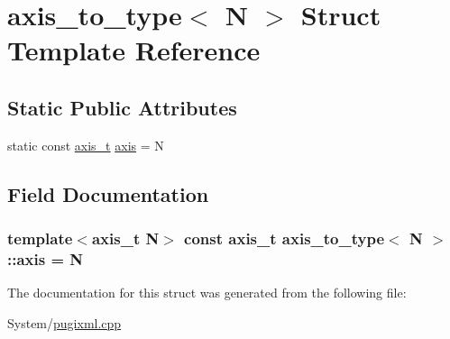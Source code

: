 \hypertarget{structaxis__to__type}{\section{axis\-\_\-to\-\_\-type$<$ N $>$ Struct Template Reference}
\label{structaxis__to__type}
}
\subsection*{Static Public Attributes}
\begin{DoxyCompactItemize}
\item 
static const \hyperlink{pugixml_8cpp_ae7747145441b0591a5c04f20f6f9189a}{axis\-\_\-t} \hyperlink{structaxis__to__type_ac9d75681918ad98c980db0f49b570b50}{axis} = N
\end{DoxyCompactItemize}


\subsection{Field Documentation}
\hypertarget{structaxis__to__type_ac9d75681918ad98c980db0f49b570b50}{
\subsubsection[{axis}]{\setlength{\rightskip}{0pt plus 5cm}template$<$axis\-\_\-t N$>$ const {\bf axis\-\_\-t} {\bf axis\-\_\-to\-\_\-type}$<$ N $>$\-::axis = N\hspace{0.3cm}{\ttfamily [static]}}}\label{structaxis__to__type_ac9d75681918ad98c980db0f49b570b50}


The documentation for this struct was generated from the following file\-:\begin{DoxyCompactItemize}
\item 
System/\hyperlink{pugixml_8cpp}{pugixml.\-cpp}\end{DoxyCompactItemize}
